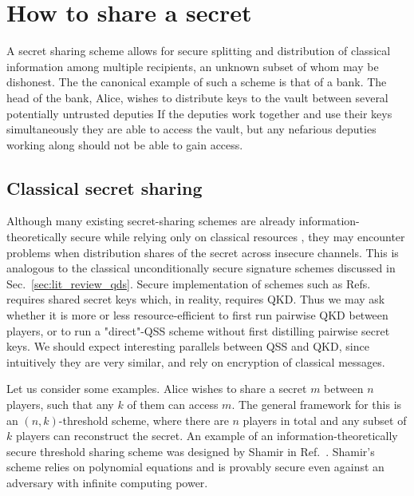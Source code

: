 \section{How to share a secret}\label{sec:qss_lit_review}
A secret sharing scheme allows for secure splitting and distribution of classical information among multiple recipients, an unknown subset of whom may be dishonest. The the canonical example of such a scheme is that of a bank. The head of the bank, Alice, wishes to distribute keys to the vault between several potentially untrusted deputies If the deputies work together and use their keys simultaneously they are able to access the vault, but any nefarious deputies working along should not be able to gain access.




\subsection{Classical secret sharing}\label{sec:qss_qcss}
Although many existing secret-sharing schemes are already information-theoretically secure while relying only on classical resources \cite{Shamir1976, Blakley1979}, they may encounter problems when distribution shares of the secret across insecure channels. This is analogous to the classical unconditionally secure signature schemes discussed in Sec.~\ref{sec:lit_review_qds}. Secure implementation of schemes such as Refs.~\cite{Wallden2015, Amiri2015a} requires shared secret keys which, in reality, requires QKD. Thus we may ask whether it is more or less resource-efficient to first run pairwise QKD between players, or to run a "direct"-QSS scheme without first distilling pairwise secret keys. We should expect interesting parallels between QSS and QKD, since intuitively they are very similar, and rely on encryption of classical messages.

Let us consider some examples. Alice wishes to share a secret $m$ between $n$ players, such that any $k$ of them can access $m$. The general framework for this is an $\left(n, k\right)$-threshold scheme, where there are $n$ players in total and any subset of $k$ players can reconstruct the secret. An example of an information-theoretically secure threshold sharing scheme was designed by Shamir in Ref.~\cite{Shamir1976}. Shamir's scheme relies on polynomial equations and is provably secure even against an adversary with infinite computing power. 

